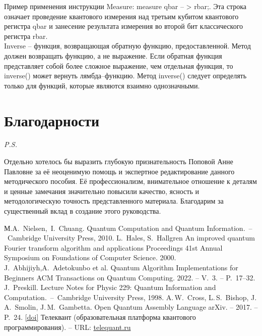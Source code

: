 \documentclass[12pt,a4paper]{article}
\begin{document}
	\indent Пример применения инструкции Measure: measure qbar -- > rbar;. Эта строка означает проведение квантового измерения над третьим кубитом квантового регистра qbar и занесение результата измерения во второй бит классического регистра rbar.\\
	\indent	Inverse -- функция, возвращающая обратную функцию, предоставленной.
	Метод должен возвращать функцию, а не выражение. Если обратная функция представляет собой более сложное выражение, чем отдельная функция, то inverse() может вернуть лямбда--функцию.
	Метод inverse() следует определять только для функций, которые являются взаимно однозначными.
	\newpage 
	\section*{Благодарности} 
	\textit{P.S.}
	
	Отдельно хотелось бы выразить глубокую признательность Поповой Анне Павловне за её неоценимую помощь и экспертное редактирование данного методического пособия. Её профессионализм, внимательное отношение к деталям и ценные замечания значительно повысили качество, ясность и методологическую точность представленного материала. Благодарим за существенный вклад в создание этого руководства.
	
	
	\newpage
	\begin{thebibliography}{99}
		\hypertarget{references}{}
		М.A.~Nielsen,~I.~Chuang. Quantum Computation and Quantum Information.~--~Cambridge University Press, 2010.  
		L.~Hales, S.~Hallgren  An improved quantum Fourier transform algorithm
		and applications  Proceedings 41st Annual Symposium on Foundations of
		Computer Science. 2000.
		J.~Abhijiyh,A.~Adetokunbo et al. Quantum Algorithm Implementations for
		Beginners  ACM Transactions on Quantum Computing. 2022. -- V.~3. -- P.~17--32.
		J.~Preskill.
		Lecture Notes for Physic 229: Quantum Information and Computation.~--~Cambridge University Press, 1998.
		A.\,W.~Cross, L.\,S.~Bishop, J.\,A.~Smolin, J.\,M.~Gambetta.
		{
			Open Quantum Assembly Language} arXiv. -- 2017. -- P.~24.
		\href{https://doi.org/10.48550/arXiv.1707.03429}{[doi]}
		Телеквант (образовательная платформа квантового программирования). -- URL: \href{https://telequant.ru/}{telequant.ru}
	\end{thebibliography}
\end{document}
